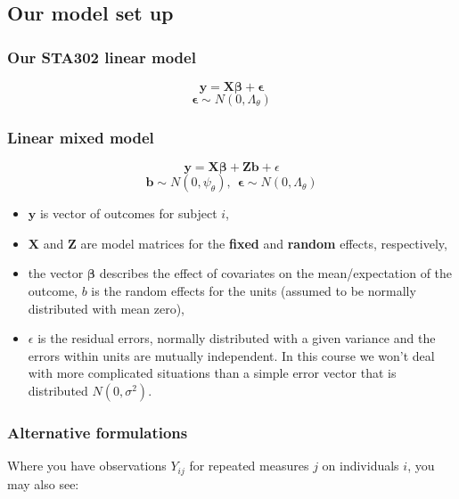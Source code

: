 \documentclass[
  openany]{book}
\providecommand{\tightlist}{%
  \setlength{\itemsep}{0pt}\setlength{\parskip}{0pt}}
\begin{document}
\hypertarget{our-model-set-up}{%
\subsection{Our model set up}\label{our-model-set-up}}

\hypertarget{our-sta302-linear-model}{%
\subsubsection{Our STA302 linear model}\label{our-sta302-linear-model}}

\[\boldsymbol{y} = \boldsymbol{X\beta} + \boldsymbol{\epsilon}\]
\[\boldsymbol{\epsilon} \sim N(0, \Lambda_\theta)\]

\hypertarget{linear-mixed-model}{%
\subsubsection{Linear mixed model}\label{linear-mixed-model}}

\[\boldsymbol{y} = \boldsymbol{X\beta} + \boldsymbol{Zb} + \epsilon\]
\[\boldsymbol{b} \sim N(0, \psi_\theta),\ \  \boldsymbol{\epsilon} \sim N(0, \Lambda_\theta)\]

\begin{itemize}
\tightlist
\item
  \(\boldsymbol{y}\) is vector of outcomes for subject \(i\),
\item
  \(\boldsymbol{X}\) and \(\boldsymbol{Z}\) are model matrices for the \textbf{fixed} and \textbf{random} effects, respectively,
\item
  the vector \(\boldsymbol{\beta}\) describes the effect of covariates on the mean/expectation of the outcome, \(b\) is the random effects for the units (assumed to be normally distributed with mean zero),
\item
  \(\epsilon\) is the residual errors, normally distributed with a given variance and the errors within units are mutually independent. In this course we won't deal with more complicated situations than a simple error vector that is distributed \(N(0, \sigma^2)\).
\end{itemize}

\hypertarget{alternative-formulations}{%
\subsubsection{Alternative formulations}\label{alternative-formulations}}

Where you have observations \(Y_{ij}\) for repeated measures \(j\) on individuals \(i\), you may also see:
\end{document}
